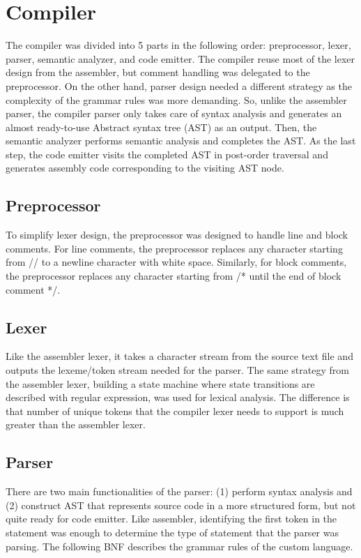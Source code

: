 \documentclass[manuscript,screen,nonacm]{acmart}
\begin{document}
\section{Compiler}
The compiler was divided into 5 parts in the following order: preprocessor, lexer, parser, semantic analyzer, and code emitter. The compiler reuse most of the lexer design from the assembler, but comment handling was delegated to the preprocessor. On the other hand, parser design needed a different strategy as the complexity of the grammar rules was more demanding. So, unlike the assembler parser, the compiler parser only takes care of syntax analysis and generates an almost ready-to-use Abstract syntax tree (AST) as an output. Then, the semantic analyzer performs semantic analysis and completes the AST. As the last step, the code emitter visits the completed AST in post-order traversal and generates assembly code corresponding to the visiting AST node.

\subsection{Preprocessor}
To simplify lexer design, the preprocessor was designed to handle line and block comments. For line comments, the preprocessor replaces any character starting from // to a newline character with white space. Similarly, for block comments, the preprocessor replaces any character starting from /* until the end of block comment */.

\subsection{Lexer}
Like the assembler lexer, it takes a character stream from the source text file and outputs the lexeme/token stream needed for the parser. The same strategy from the assembler lexer, building a state machine where state transitions are described with regular expression, was used for lexical analysis. The difference is that number of unique tokens that the compiler lexer needs to support is much greater than the assembler lexer.

\subsection{Parser}
There are two main functionalities of the parser: (1) perform syntax analysis and (2) construct AST that represents source code in a more structured form, but not quite ready for code emitter. Like assembler, identifying the first token in the statement was enough to determine the type of statement that the parser was parsing. The following BNF describes the grammar rules of the custom language. 
\end{document}
